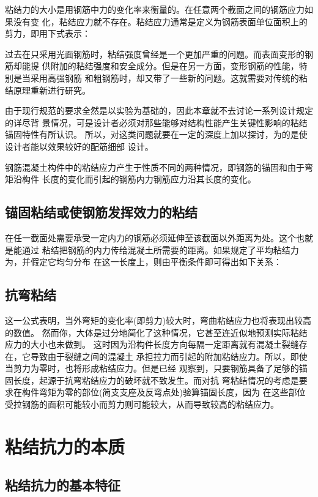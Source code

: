 \documentclass[12pt,a4paper]{book}
\begin{document}
粘结力的大小是用钢筋中力的变化率来衡量的。在任意两个截面之间的钢筋应力如果没有变
化，粘结应力就不存在。粘结应力通常是定义为钢筋表面单位面积上的剪力，即用下式表示：

过去在只采用光面钢筋时，粘结强度曾经是一个更加严重的问题。而表面变形的钢筋却能提
供附加的粘结强度和安全成分。但是在另一方面，变形钢筋的性能，特别是当采用高强钢筋
和粗钢筋时，却又带了一些新的问题。这就需要对传统的粘结原理重新进行研究。

由于现行规范的要求全然是以实验为基础的，因此本章就不去讨论一系列设计规定的详尽背
景情况，可是设计者必须对那些能够对结构性能产生关键性影响的粘结锚固特性有所认识。
所以，对这类问题就要在一定的深度上加以探讨，为的是使设计者能以效果较好的配筋细部
设计。

钢筋混凝土构件中的粘结应力产生于性质不同的两种情况，即钢筋的锚固和由于弯矩沿构件
长度的变化而引起的钢筋内力钢筋应力沿其长度的变化。

\subsection{锚固粘结或使钢筋发挥效力的粘结}

在任一截面处需要承受一定内力的钢筋必须延伸至该截面以外距离为处。这个也就是能通过
粘结把钢筋的内力传给混凝土所需要的距离。如果规定了平均粘结力为，并假定它均匀分布
在这一长度上，则由平衡条件即可得出如下关系：

\subsection{抗弯粘结}

这一公式表明，当外弯矩的变化率(即剪力)较大时，弯曲粘结应力也将表现出较高的数值。
然而你，大体是过分地简化了这种情况，它甚至连近似地预测实际粘结应力的大小也未做到。
这时因为沿构件长度方向每隔一定距离就有混凝土裂缝存在，它导致由于裂缝之间的混凝土
承担拉力而引起的附加粘结应力。所以，即使当剪力为零时，也将形成粘结应力。但是已经
观察到，只要钢筋具备了足够的锚固长度，起源于抗弯粘结应力的破坏就不致发生。而对抗
弯粘结情况的考虑是要求在构件弯矩为零的部位(简支支座及反弯点处)验算锚固长度，因为
在这些部位受拉钢筋的面积可能较小而剪力则可能较大，从而导致较高的粘结应力。


\section{粘结抗力的本质}

\subsection{粘结抗力的基本特征}
\end{document}
